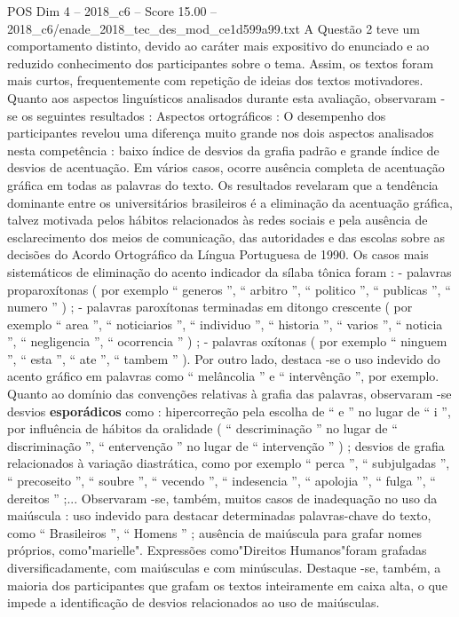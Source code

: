 \begin{textsample}{POS Dim 4 – 2018\_c6 – Score 15.00 – 2018\_c6/enade\_2018\_tec\_des\_mod\_ce1d599a99.txt}
A Questão 2 teve um comportamento distinto, devido ao caráter mais expositivo do enunciado e ao reduzido conhecimento dos participantes sobre o tema.
Assim, os textos foram mais curtos, frequentemente com repetição de ideias dos textos motivadores.
Quanto aos aspectos linguísticos analisados durante esta avaliação, observaram -se os seguintes resultados : Aspectos ortográficos : O desempenho dos participantes revelou uma diferença muito grande nos dois aspectos analisados nesta competência : baixo índice de desvios da grafia padrão e grande índice de desvios de acentuação.
Em vários casos, ocorre ausência completa de acentuação gráfica em todas as palavras do texto.
Os resultados revelaram que a tendência dominante entre os universitários brasileiros é a eliminação da acentuação gráfica, talvez motivada pelos hábitos relacionados às redes sociais e pela ausência de esclarecimento dos meios de comunicação, das autoridades e das escolas sobre as decisões do Acordo Ortográfico da Língua Portuguesa de 1990.
Os casos mais sistemáticos de eliminação do acento indicador da sílaba tônica foram : - palavras proparoxítonas ( por exemplo “ generos ”, “ arbitro ”, “ politico ”, “ publicas ”, “ numero ” ) ; - palavras paroxítonas terminadas em ditongo crescente ( por exemplo “ area ”, “ noticiarios ”, “ individuo ”, “ historia ”, “ varios ”, “ noticia ”, “ negligencia ”, “ ocorrencia ” ) ; - palavras oxítonas ( por exemplo “ ninguem ”, “ esta ”, “ ate ”, “ tambem ” ).
Por outro lado, destaca -se o uso indevido do acento gráfico em palavras como “ melâncolia ” e “ intervênção ”, por exemplo.
Quanto ao domínio das convenções relativas à grafia das palavras, observaram -se desvios \textbf{esporádicos} como : hipercorreção pela escolha de “ e ” no lugar de “ i ”, por influência de hábitos da oralidade ( “ descriminação ” no lugar de “ discriminação ”, “ entervenção ” no lugar de “ intervenção ” ) ; desvios de grafia relacionados à variação diastrática, como por exemplo “ perca ”, “ subjulgadas ”, “ precoseito ”, “ soubre ”, “ vecendo ”, “ indesencia ”, “ apolojia ”, “ fulga ”, “ dereitos ” ;...
Observaram -se, também, muitos casos de inadequação no uso da maiúscula : uso indevido para destacar determinadas palavras-chave do texto, como “ Brasileiros ”, “ Homens ” ; ausência de maiúscula para grafar nomes próprios, como"marielle".
Expressões como"Direitos Humanos"foram grafadas diversificadamente, com maiúsculas e com minúsculas.
Destaque -se, também, a maioria dos participantes que grafam os textos inteiramente em caixa alta, o que impede a identificação de desvios relacionados ao uso de maiúsculas.

\end{textsample}
